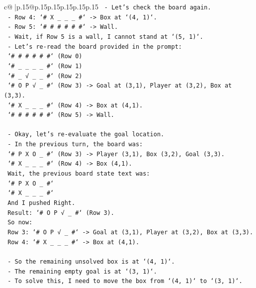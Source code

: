 \documentclass{article}
\begin{document}
{\begin{supertabular}{c@{$\;$}|p{.15\linewidth}@{}p{.15\linewidth}p{.15\linewidth}p{.15\linewidth}p{.15\linewidth}p{.15\linewidth}}
{{{\texttt{    {-} Let's check the board again.} \\
\texttt{    {-} Row 4: `\# X \_ \_ \_ \#` {-}> Box at `(4, 1)`.} \\
\texttt{    {-} Row 5: `\# \# \# \# \# \#` {-}> Wall.} \\
\texttt{    {-} Wait, if Row 5 is a wall, I cannot stand at `(5, 1)`.} \\
\texttt{    {-} Let's re{-}read the board provided in the prompt:} \\
\texttt{      `\# \# \# \# \# \#` (Row 0)} \\
\texttt{      `\# \_ \_ \_ \_ \#` (Row 1)} \\
\texttt{      `\# \_ √ \_ \_ \#` (Row 2)} \\
\texttt{      `\# O P √ \_ \#` (Row 3) {-}> Goal at (3,1), Player at (3,2), Box at (3,3).} \\
\texttt{      `\# X \_ \_ \_ \#` (Row 4) {-}> Box at (4,1).} \\
\texttt{      `\# \# \# \# \# \#` (Row 5) {-}> Wall.} \\
\\ 
\texttt{    {-} Okay, let's re{-}evaluate the goal location.} \\
\texttt{    {-} In the previous turn, the board was:} \\
\texttt{      `\# P X O \_ \#` (Row 3) {-}> Player (3,1), Box (3,2), Goal (3,3).} \\
\texttt{      `\# X \_ \_ \_ \#` (Row 4) {-}> Box (4,1).} \\
\texttt{      Wait, the previous board state text was:} \\
\texttt{      `\# P X O \_ \#`} \\
\texttt{      `\# X \_ \_ \_ \#`} \\
\texttt{      And I pushed Right.} \\
\texttt{      Result: `\# O P √ \_ \#` (Row 3).} \\
\texttt{      So now:} \\
\texttt{      Row 3: `\# O P √ \_ \#` {-}> Goal at (3,1), Player at (3,2), Box at (3,3).} \\
\texttt{      Row 4: `\# X \_ \_ \_ \#` {-}> Box at (4,1).} \\
\\ 
\texttt{    {-} So the remaining unsolved box is at `(4, 1)`.} \\
\texttt{    {-} The remaining empty goal is at `(3, 1)`.} \\
\texttt{    {-} To solve this, I need to move the box from `(4, 1)` to `(3, 1)`.} \\
}}}
\end{supertabular}}
\end{document}
